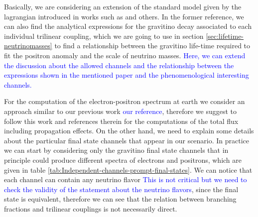 \documentclass[a4paper,11pt]{article}
\newcommand*{\blue}{\textcolor{blue}}
\begin{document}

Basically, we are considering an extension of the standard model given by the lagrangian introduced in
works such as \cite{Moreau:2001sr} and others. In the former reference, we can also find the analytical expressions for the gravitino decay associated to each individual trilinear coupling, which we are going to use in section \ref{sec:lifetime-neutrinomasses} to find a relationship between the gravitino life-time required to fit the positron anomaly and the scale of neutrino masses. \blue{Here, we can extend the discussion about the allowed channels and the relationship between the expressions shown
in the mentioned paper and the phenomenological interesting channels.}

For the computation of the electron-positron spectrum at earth we consider an approach similar to our previous work \blue{our reference}, therefore we suggest to follow this work and references therein for the computations of the total flux including propagation effects. On the other hand, we need to explain some details about the particular final state channels that appear in our scenario. In practice we can start by considering only the gravitino final state channels that in principle could produce different spectra of electrons and positrons, which are given in table \ref{tab:Independent-channels-prompt-final-states}. We can notice that each channel can contain any neutrino flavor \blue{This is not critical but we need to check the validity of the statement about the neutrino flavors}, since the final state is equivalent, therefore we can see that the relation between branching fractions and trilinear couplings is not necessarily direct.
\end{document}
